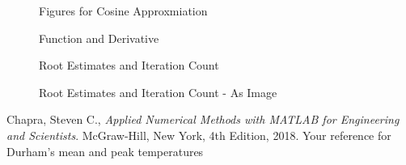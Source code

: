 \documentclass{article}
\begin{document}
\begin{figure}[ht!]
\begin{center}
\begin{tabular}{cc}
\end{tabular}
\caption{Figures for Cosine Approxmiation}
\end{center}
\end{figure}
\clearpage
\begin{figure}[ht!]
\begin{center}
\caption{Function and Derivative}
\end{center}
\end{figure}
\begin{figure}[ht!]
\begin{center}
\caption{Root Estimates and Iteration Count}
\end{center}
\end{figure}
\begin{figure}[ht!]
\begin{center}
\caption{Root Estimates and Iteration Count - As Image}
\end{center}
\end{figure}
\clearpage

\begin{thebibliography}{9}
  Chapra, Steven C.,
  {\it Applied Numerical Methods with MATLAB for Engineering and Scientists}.
  McGraw-Hill, New York,
  4th Edition,
  2018.
   Your reference for Durham's mean and peak temperatures
\end{thebibliography}
\end{document}
